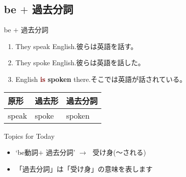 \documentclass[aspectratio=169,xcolor={dvipsnames,table}]{beamer}
\begin{document}
\subsection{be $+$ 過去分詞}
\begin{frame}[plain]{be $+$ 過去分詞}
 \Large
\begin{enumerate}
 \item They speak English.\hfill{}{\small 彼らは英語を話す。}
 \item They spoke English.\hfill{\small 彼らは英語を話した。}
 \item English \textcolor{Maroon}{\bfseries is} \textcolor{NavyBlue}{\bfseries spoken} there.\hfill{\small そこでは英語が話されている。}
\end{enumerate}

\begin{center}
 
{\small%
\begin{tabular}{lll}
{\small 原形}&{\small 過去形}&{\small 過去分詞}\\\hline
speak&spoke&spoken
\end{tabular}%
}
\end{center}

\vfill

\begin{exampleblock}{Topics for Today}
\begin{itemize}\small
 \item `be動詞$+$ 過去分詞' $\longrightarrow$\,\,\,\,受け身(〜される)
 \item 「過去分詞」は「受け身」の意味を表します
\end{itemize}
     \end{exampleblock}
\end{frame}
\end{document}
